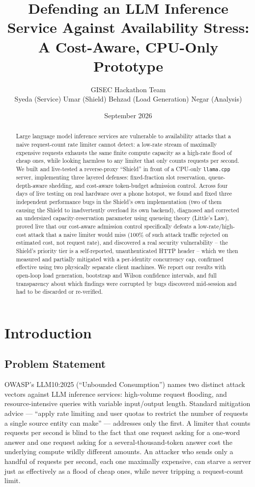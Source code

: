 \documentclass[11pt]{article}
\title{\textbf{Defending an LLM Inference Service Against Availability Stress:\\
A Cost-Aware, CPU-Only Prototype}}
\author{GISEC Hackathon Team \\ Syeda (Service) \quad Umar (Shield) \quad Behzad (Load Generation) \quad Negar (Analysis)}
\date{September 2026}
\begin{document}
\maketitle

\begin{abstract}
Large language model inference services are vulnerable to availability attacks
that a naive request-count rate limiter cannot detect: a low-rate stream of
maximally expensive requests exhausts the same finite compute capacity as a
high-rate flood of cheap ones, while looking harmless to any limiter that only
counts requests per second. We built and live-tested a reverse-proxy ``Shield''
in front of a CPU-only \texttt{llama.cpp} server, implementing three layered
defenses: fixed-fraction slot reservation, queue-depth-aware shedding, and
cost-aware token-budget admission control. Across four days of live testing on
real hardware over a phone hotspot, we found and fixed three independent
performance bugs in the Shield's own implementation (two of them causing the
Shield to inadvertently overload its own backend), diagnosed and corrected an
undersized capacity-reservation parameter using queueing theory (Little's Law),
proved live that our cost-aware admission control specifically defeats a
low-rate/high-cost attack that a naive limiter would miss (100\% of such attack
traffic rejected on estimated cost, not request rate), and discovered a real
security vulnerability -- the Shield's priority tier is a self-reported,
unauthenticated HTTP header -- which we then measured and partially mitigated
with a per-identity concurrency cap, confirmed effective using two physically
separate client machines. We report our results with open-loop load generation,
bootstrap and Wilson confidence intervals, and full transparency about which
findings were corrupted by bugs discovered mid-session and had to be discarded
or re-verified.
\end{abstract}

\tableofcontents

\section{Introduction}

\subsection{Problem Statement}

OWASP's LLM10:2025 (``Unbounded Consumption'') names two distinct attack
vectors against LLM inference services: high-volume request flooding, and
resource-intensive queries with variable input/output length. Standard
mitigation advice --- ``apply rate limiting and user quotas to restrict the
number of requests a single source entity can make'' --- addresses only the
first. A limiter that counts requests per second is blind to the fact that one
request asking for a one-word answer and one request asking for a
several-thousand-token answer cost the underlying compute wildly different
amounts. An attacker who sends only a handful of requests per second, each one
maximally expensive, can starve a server just as effectively as a flood of
cheap ones, while never tripping a request-count limit.
\end{document}
